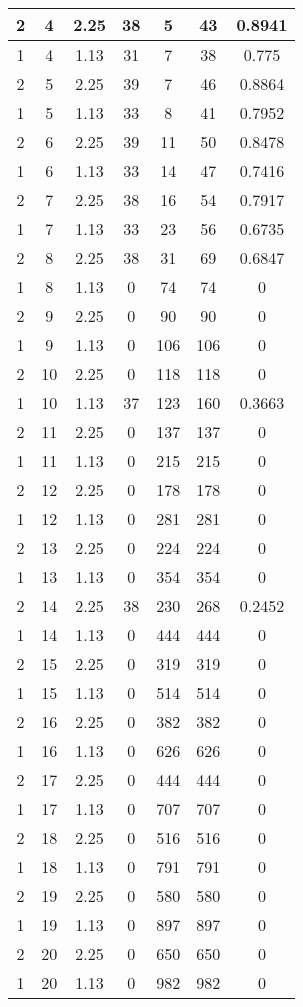\documentclass[letterpaper, 12pt]{article}
\begin{document}
\begin{longtable}{|c|c|c|c|c|c|c|}
\hline
2 & 4 & 2.25 & 38 & 5 & 43 & 0.8941 \\
\hline
1 & 4 & 1.13 & 31 & 7 & 38 & 0.775 \\
\hline
2 & 5 & 2.25 & 39 & 7 & 46 & 0.8864 \\
\hline
1 & 5 & 1.13 & 33 & 8 & 41 & 0.7952 \\
\hline
2 & 6 & 2.25 & 39 & 11 & 50 & 0.8478 \\
\hline
1 & 6 & 1.13 & 33 & 14 & 47 & 0.7416 \\
\hline
2 & 7 & 2.25 & 38 & 16 & 54 & 0.7917 \\
\hline
1 & 7 & 1.13 & 33 & 23 & 56 & 0.6735 \\
\hline
2 & 8 & 2.25 & 38 & 31 & 69 & 0.6847 \\
\hline
1 & 8 & 1.13 & 0 & 74 & 74 & 0 \\
\hline
2 & 9 & 2.25 & 0 & 90 & 90 & 0 \\
\hline
1 & 9 & 1.13 & 0 & 106 & 106 & 0 \\
\hline
2 & 10 & 2.25 & 0 & 118 & 118 & 0 \\
\hline
1 & 10 & 1.13 & 37 & 123 & 160 & 0.3663 \\
\hline
2 & 11 & 2.25 & 0 & 137 & 137 & 0 \\
\hline
1 & 11 & 1.13 & 0 & 215 & 215 & 0 \\
\hline
2 & 12 & 2.25 & 0 & 178 & 178 & 0 \\
\hline
1 & 12 & 1.13 & 0 & 281 & 281 & 0 \\
\hline
2 & 13 & 2.25 & 0 & 224 & 224 & 0 \\
\hline
1 & 13 & 1.13 & 0 & 354 & 354 & 0 \\
\hline
2 & 14 & 2.25 & 38 & 230 & 268 & 0.2452 \\
\hline
1 & 14 & 1.13 & 0 & 444 & 444 & 0 \\
\hline
2 & 15 & 2.25 & 0 & 319 & 319 & 0 \\
\hline
1 & 15 & 1.13 & 0 & 514 & 514 & 0 \\
\hline
2 & 16 & 2.25 & 0 & 382 & 382 & 0 \\
\hline
1 & 16 & 1.13 & 0 & 626 & 626 & 0 \\
\hline
2 & 17 & 2.25 & 0 & 444 & 444 & 0 \\
\hline
1 & 17 & 1.13 & 0 & 707 & 707 & 0 \\
\hline
2 & 18 & 2.25 & 0 & 516 & 516 & 0 \\
\hline
1 & 18 & 1.13 & 0 & 791 & 791 & 0 \\
\hline
2 & 19 & 2.25 & 0 & 580 & 580 & 0 \\
\hline
1 & 19 & 1.13 & 0 & 897 & 897 & 0 \\
\hline
2 & 20 & 2.25 & 0 & 650 & 650 & 0 \\
\hline
1 & 20 & 1.13 & 0 & 982 & 982 & 0 \\
\hline
\end{longtable}
\end{document}

